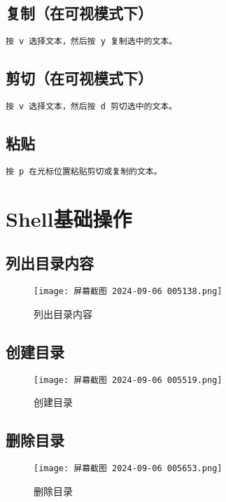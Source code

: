 \documentclass[a4paper, 12pt]{article}
\begin{document}
\newpage
\subsection{复制（在可视模式下）}
\begin{lstlisting}
按 v 选择文本，然后按 y 复制选中的文本。
\end{lstlisting}

\subsection{剪切（在可视模式下）}
\begin{lstlisting}
按 v 选择文本，然后按 d 剪切选中的文本。
\end{lstlisting}

\subsection{粘贴}
\begin{lstlisting}
按 p 在光标位置粘贴剪切或复制的文本。
\end{lstlisting}


\newpage
\section{Shell基础操作}
\subsection{列出目录内容}
\begin{figure}[H]
    \centering
    \texttt{[image: 屏幕截图 2024-09-06 005138.png]}
    \caption{列出目录内容}
\end{figure}

\subsection{创建目录}
\begin{figure}[H]
    \centering
    \texttt{[image: 屏幕截图 2024-09-06 005519.png]}
    \caption{创建目录}
\end{figure}

\subsection{删除目录}
\begin{figure}[H]
    \centering
    \texttt{[image: 屏幕截图 2024-09-06 005653.png]}
    \caption{删除目录}
\end{figure}
\end{document}
